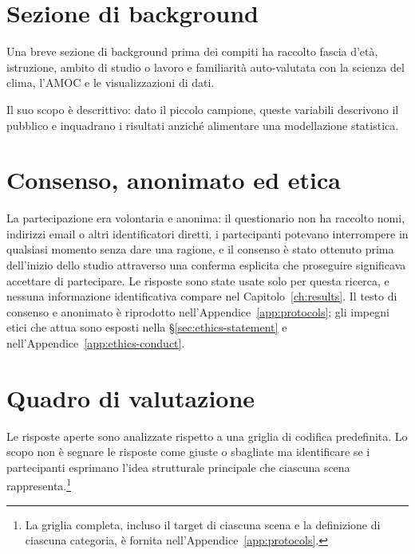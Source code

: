 \section{Sezione di background}
\label{sec:eval-demographics}

Una breve sezione di background prima dei compiti ha raccolto fascia d'età, istruzione, ambito di studio o lavoro e familiarità auto-valutata con la scienza del clima, l'AMOC e le visualizzazioni di dati.

Il suo scopo è descrittivo: dato il piccolo campione, queste variabili descrivono il pubblico e inquadrano i risultati anziché alimentare una modellazione statistica.

\section{Consenso, anonimato ed etica}
\label{sec:eval-ethics}

La partecipazione era volontaria e anonima: il questionario non ha raccolto nomi, indirizzi email o altri identificatori diretti, i partecipanti potevano interrompere in qualsiasi momento senza dare una ragione, e il consenso è stato ottenuto prima dell'inizio dello studio attraverso una conferma esplicita che proseguire significava accettare di partecipare. Le risposte sono state usate solo per questa ricerca, e nessuna informazione identificativa compare nel Capitolo~\ref{ch:results}. Il testo di consenso e anonimato è riprodotto nell'Appendice~\ref{app:protocols}; gli impegni etici che attua sono esposti nella \S\ref{sec:ethics-statement} e nell'Appendice~\ref{app:ethics-conduct}.

\section{Quadro di valutazione}
\label{sec:eval-framework}

Le risposte aperte sono analizzate rispetto a una griglia di codifica predefinita. Lo scopo non è segnare le risposte come giuste o sbagliate ma identificare se i partecipanti esprimano l'idea strutturale principale che ciascuna scena rappresenta.\footnote{La griglia completa, incluso il target di ciascuna scena e la definizione di ciascuna categoria, è fornita nell'Appendice~\ref{app:protocols}.}

